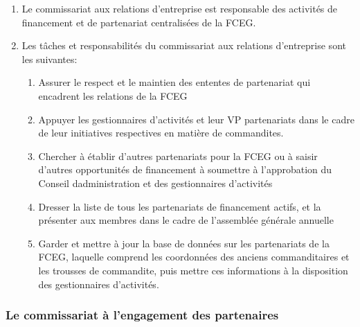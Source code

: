 \begin{enumerate}
 \item
  Le commissariat aux relations d’entreprise est responsable des activités de financement et de partenariat centralisées de la FCEG.
 \item
  Les tâches et responsabilités du commissariat aux relations d’entreprise sont les suivantes:

  \begin{enumerate}
   \item
    Assurer le respect et le maintien des ententes de partenariat qui encadrent les relations de la FCEG
   \item
    Appuyer les gestionnaires d’activités et leur VP partenariats dans le cadre de leur initiatives respectives en matière de commandites.
   \item
    Chercher à établir d’autres partenariats pour la FCEG ou à saisir d’autres opportunités de financement à soumettre à l’approbation du Conseil d\textquotesingle administration et des gestionnaires d’activités
   \item
    Dresser la liste de tous les partenariats de financement actifs, et la présenter aux membres dans le cadre de l’assemblée générale annuelle
   \item
    Garder et mettre à jour la base de données sur les partenariats de la FCEG, laquelle comprend les coordonnées des anciens commanditaires et les trousses de commandite, puis mettre ces informations à la disposition des gestionnaires d’activités.
  \end{enumerate}
\end{enumerate}

\subsubsection{Le commissariat à l’engagement des partenaires}
\label{le-commissariat-a-l-engagement-des-partenaires}

